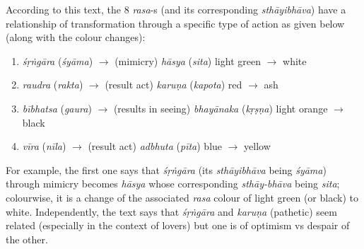 According to this text, the 8 \textsl{rasa}-s (and its corresponding \textsl{sthāyibhāva}) have a relationship of transformation through a specific type of action as given below (along with the colour changes):
\begin{enumerate}
\item \textsl{śṛṅgāra} (\textsl{śyāma}) $\to$ (mimicry) \textsl{hāsya}
 (\textsl{sita}) light green $\to$ white

\item \textsl{raudra} (\textsl{rakta}) $\to$ (result act) \textsl{karuṇa} (\textsl{kapota}) red $\to$ ash

\item \textsl{bībhatsa} (\textsl{gaura}) $\to$ (results in seeing) \textsl{bhayānaka} (\textsl{kṛṣṇa}) light orange $\to$ black

\item \textsl{vīra} (\textsl{nīla}) $\to$ (result act) \textsl{adbhuta}
 (\textsl{pīta}) blue $\to$ yellow 
\end{enumerate}

For example, the first one says that \textsl{śṛṅgāra} (its \textsl{sthāyibhāva} being \textsl{śyāma}) through mimicry becomes \textsl{hāsya} whose corresponding \textsl{sthāy-bhāva} being \textsl{sita}; colourwise, it is a change of the associated \textsl{rasa} colour of light green (or black) to white. Independently, the text says that \textsl{śṛṅgāra} and \textsl{karuṇa} (pathetic) seem related (especially in the context of lovers) but one is of optimism vs despair of the other.

